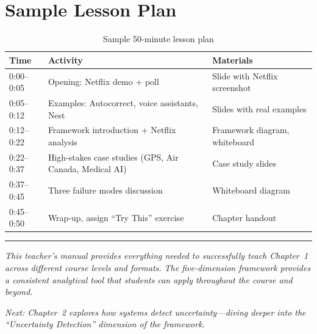 \section{Sample Lesson Plan}

\begin{table}[htbp]
\caption{Sample 50-minute lesson plan}
\label{tab:lesson-plan}
\centering
\begin{tabular}{@{}p{2.5cm}p{6cm}p{4cm}@{}}
\toprule
\textbf{Time} & \textbf{Activity} & \textbf{Materials} \\
\midrule
0:00--0:05 & Opening: Netflix demo + poll & Slide with Netflix screenshot \\
0:05--0:12 & Examples: Autocorrect, voice assistants, Nest & Slides with real examples \\
0:12--0:22 & Framework introduction + Netflix analysis & Framework diagram, whiteboard \\
0:22--0:37 & High-stakes case studies (GPS, Air Canada, Medical AI) & Case study slides \\
0:37--0:45 & Three failure modes discussion & Whiteboard diagram \\
0:45--0:50 & Wrap-up, assign ``Try This'' exercise & Chapter handout \\
\bottomrule
\end{tabular}
\end{table}

\bigskip
\begin{center}
\rule{0.5\textwidth}{0.4pt}
\end{center}
\bigskip

\noindent\textit{This teacher's manual provides everything needed to successfully teach Chapter~1 across different course levels and formats. The five-dimension framework provides a consistent analytical tool that students can apply throughout the course and beyond.}

\medskip
\noindent\textit{Next: Chapter~2 explores how systems detect uncertainty---diving deeper into the ``Uncertainty Detection'' dimension of the framework.}
